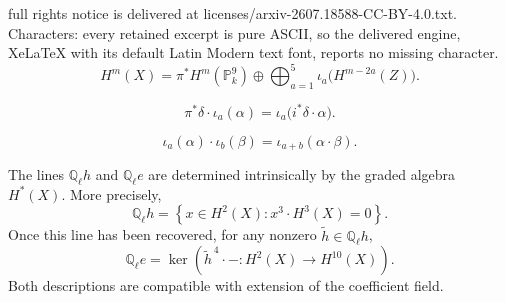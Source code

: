 \documentclass[10pt,a4paper]{amsart}
\newcommand\PP{\mathbb{P}}
\newcommand\QQ{\mathbb{Q}}
\begin{document}
full rights notice is delivered at licenses/arxiv-2607.18588-CC-BY-4.0.txt. Characters: every retained excerpt is pure ASCII, so the delivered engine, XeLaTeX with its default Latin Modern text font, reports no missing character.
\begin{equation}
\label{eqn:blowup-for-X}
H^m(X)
=
\pi^*H^m(\PP^9_k)
\oplus
\bigoplus_{a=1}^{5}
\iota_a\bigl(H^{m-2a}(Z)\bigr).
\end{equation}

\begin{equation}
\label{eqn:ambient-exceptional-product}
\pi^*\delta\cdot\iota_a(\alpha)
=
\iota_a\bigl(i^*\delta\cdot\alpha\bigr).
\end{equation}

\begin{equation}
\label{eqn:exceptional-product}
\iota_a(\alpha)\cdot\iota_b(\beta)
=
\iota_{a+b}(\alpha\cdot\beta).
\end{equation}

\begin{lemma}
\label{lem:distinguished-lines}
The lines $\QQ_\ell h$ and $\QQ_\ell e$ are determined intrinsically by
the graded algebra $H^*(X)$.  More precisely,
\begin{equation}
\label{eqn:hyperplane-line}
\QQ_\ell h
=
\left\{
x\in H^2(X):x^3\cdot H^3(X)=0
\right\}.
\end{equation}
Once this line has been recovered, for any nonzero
$\widetilde h\in\QQ_\ell h$,
\begin{equation}
\label{eqn:exceptional-line}
\QQ_\ell e
=
\ker\left(
\widetilde h^{\,4}\cdot-:
H^2(X)\longrightarrow H^{10}(X)
\right).
\end{equation}
Both descriptions are compatible with extension of the coefficient
field.
\end{lemma}
\end{document}
